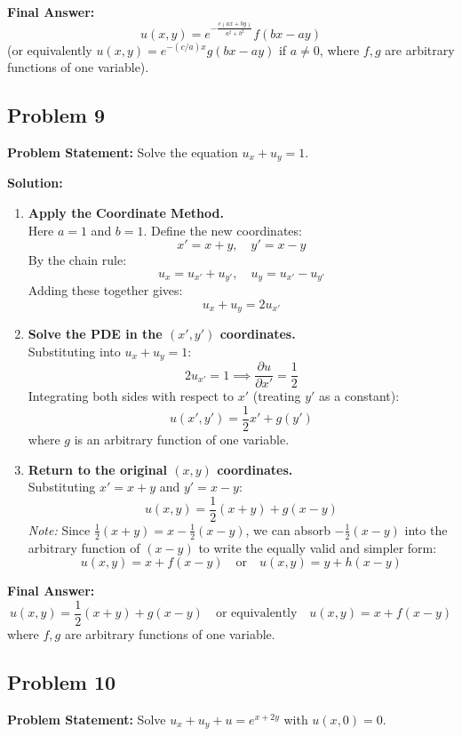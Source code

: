 \documentclass[11pt]{article}
\begin{document}
\noindent\textbf{Final Answer:}
\[
\boxed{u(x, y) = e^{-\frac{c(ax + by)}{a^2 + b^2}}f(bx - ay)}
\]
(or equivalently $u(x, y) = e^{-(c/a)x}g(bx - ay)$ if $a \neq 0$, where $f, g$ are arbitrary functions of one variable).

\hrulefill

\subsection*{Problem 9}
\textbf{Problem Statement:} Solve the equation $u_x + u_y = 1$.

\textbf{Solution:}
\begin{enumerate}[label=\textbf{Step \arabic*:}]
    \item \textbf{Apply the Coordinate Method.} \\
    Here $a = 1$ and $b = 1$. Define the new coordinates:
    \[
    x' = x + y, \quad y' = x - y
    \]
    By the chain rule:
    \[
    u_x = u_{x'} + u_{y'}, \quad u_y = u_{x'} - u_{y'}
    \]
    Adding these together gives:
    \[
    u_x + u_y = 2u_{x'}
    \]

    \item \textbf{Solve the PDE in the $(x', y')$ coordinates.} \\
    Substituting into $u_x + u_y = 1$:
    \[
    2u_{x'} = 1 \implies \frac{\partial u}{\partial x'} = \frac{1}{2}
    \]
    Integrating both sides with respect to $x'$ (treating $y'$ as a constant):
    \[
    u(x', y') = \frac{1}{2}x' + g(y')
    \]
    where $g$ is an arbitrary function of one variable.

    \item \textbf{Return to the original $(x, y)$ coordinates.} \\
    Substituting $x' = x + y$ and $y' = x - y$:
    \[
    u(x, y) = \frac{1}{2}(x + y) + g(x - y)
    \]
    \emph{Note:} Since $\frac{1}{2}(x + y) = x - \frac{1}{2}(x - y)$, we can absorb $-\frac{1}{2}(x - y)$ into the arbitrary function of $(x - y)$ to write the equally valid and simpler form:
    \[
    u(x, y) = x + f(x - y) \quad \text{or} \quad u(x, y) = y + h(x - y)
    \]
\end{enumerate}

\noindent\textbf{Final Answer:}
\[
\boxed{u(x, y) = \frac{1}{2}(x + y) + g(x - y) \quad \text{or equivalently} \quad u(x, y) = x + f(x - y)}
\]
where $f, g$ are arbitrary functions of one variable.

\hrulefill

\subsection*{Problem 10}
\textbf{Problem Statement:} Solve $u_x + u_y + u = e^{x+2y}$ with $u(x, 0) = 0$.
\end{document}
